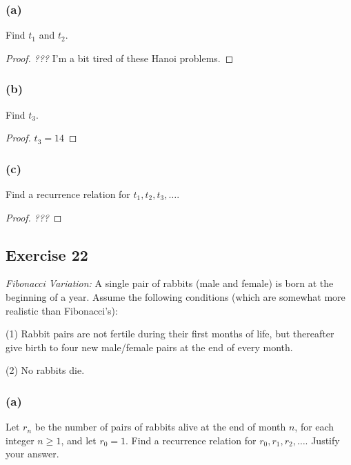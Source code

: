 \documentclass[14pt]{extarticle}
\begin{document}
\subsubsection{(a)}
Find $t_1$ and $t_2$.

\begin{proof}
{\it ???} I'm a bit tired of these Hanoi problems.
\end{proof}

\subsubsection{(b)}
Find $t_3$.

\begin{proof}
$t_3 = 14$
\end{proof}

\subsubsection{(c)}
Find a recurrence relation for $t_1, t_2, t_3, \ldots$.

\begin{proof}
{\it ???}
\end{proof}

\subsection{Exercise 22}
{\it Fibonacci Variation:} A single pair of rabbits (male and female) is born at the beginning of a year. 
Assume the following conditions (which are somewhat more realistic than Fibonacci’s):

(1) Rabbit pairs are not fertile during their first months of life, but thereafter give birth to four new male/female 
pairs at the end of every month.

(2) No rabbits die.

\subsubsection{(a)}
Let $r_n$ be the number of pairs of rabbits alive at the end of month $n$, for each integer $n \geq 1$, and let 
$r_0 = 1$. Find a recurrence relation for $r_0, r_1, r_2, \ldots$. Justify your answer.
\end{document}
